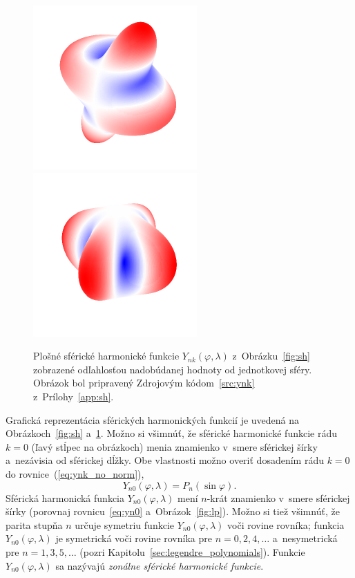 \documentclass[a4paper,12pt]{book}
\begin{document}
\begin{figure}[bt]
\includegraphics{./fig-spherical-harmonic-n4-k1-3d.pdf}
\includegraphics{./fig-spherical-harmonic-n4-k4-3d.pdf}
\caption{Plošné sférické harmonické funkcie $Y_{nk}(\varphi, \lambda)$
z~Obrázku~\ref{fig:sh} zobrazené odľahlosťou nadobúdanej hodnoty od jednotkovej
sféry.  Obrázok bol pripravený Zdrojovým kódom~\ref{src:ynk}
z~Prílohy~\ref{app:sh}.}
\label{fig:sh3d}
\end{figure}

Grafická reprezentácia sférických harmonických funkcií je uvedená na
Obrázkoch~\ref{fig:sh} a~\ref{fig:sh3d}.  Možno si všimnúť, že sférické
harmonické funkcie rádu $k = 0$ (ľavý stĺpec na obrázkoch) menia znamienko
v~smere sférickej šírky a~nezávisia od sférickej dĺžky.  Obe vlastnosti možno
overiť dosadením rádu $k = 0$ do rovnice~(\ref{eq:ynk_no_norm}),
%
\begin{equation}
\label{eq:yn0}
Y_{n0}(\varphi, \lambda) = P_n(\sin\varphi){.}
\end{equation}
%
Sférická harmonická funkcia $Y_{n0}(\varphi, \lambda)$ mení $n$-krát znamienko
v~smere sférickej šírky (porovnaj rovnicu~\ref{eq:yn0} a~Obrázok~\ref{fig:lp}).
Možno si tiež všimnúť, že parita stupňa $n$ určuje symetriu funkcie
$Y_{n0}(\varphi, \lambda)$ voči rovine rovníka; funkcia $Y_{n0}(\varphi,
\lambda)$ je symetrická voči rovine rovníka pre $n = 0, 2, 4, \dots$
a~nesymetrická pre $n = 1, 3, 5, \dots$ (pozri
Kapitolu~\ref{sec:legendre_polynomials}). Funkcie $Y_{n0}(\varphi, \lambda)$ sa
nazývajú \emph{zonálne sférické harmonické funkcie}.
\end{document}
